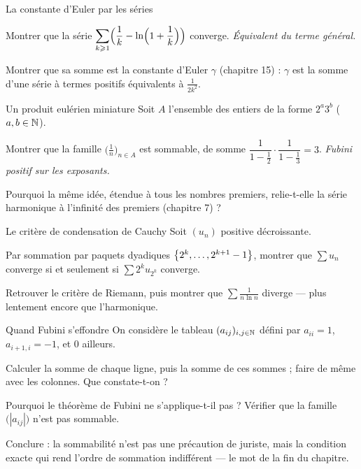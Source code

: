 \begin{exercice}[3]{La constante d'Euler par les séries}
\begin{questions}
  \item Montrer que la série
    $\displaystyle\sum_{k\geqslant1}\Bigl(\frac1k-\ln\Bigl(1+\frac1k\Bigr)\Bigr)$
    converge. \emph{Équivalent du terme général.}
  \item Montrer que sa somme est la constante d'Euler $\gamma$
    (chapitre 15) : $\gamma$ est la somme d'une série à termes positifs
    équivalents à $\frac{1}{2k^{2}}$.
\end{questions}
\end{exercice}

\begin{exercice}[3]{Un produit eulérien miniature}
Soit $A$ l'ensemble des entiers de la forme $2^{a}3^{b}$
($a,b\in\mathbb{N}$).
\begin{questions}
  \item Montrer que la famille $\bigl(\frac1n\bigr)_{n\in A}$ est
    sommable, de somme
    $\dfrac{1}{1-\frac12}\cdot\dfrac{1}{1-\frac13}=3$. \emph{Fubini
    positif sur les exposants.}
  \item Pourquoi la même idée, étendue à tous les nombres premiers,
    relie-t-elle la série harmonique à l'infinité des premiers
    (chapitre 7) ?
\end{questions}
\end{exercice}

\begin{exercice}[3]{Le critère de condensation de Cauchy}
Soit $(u_n)$ positive décroissante.
\begin{questions}
  \item Par sommation par paquets dyadiques
    $\left\{2^{k},\dots,2^{k+1}-1\right\}$, montrer que $\sum u_n$ converge si et
    seulement si $\sum2^{k}u_{2^{k}}$ converge.
  \item Retrouver le critère de Riemann, puis montrer que
    $\displaystyle\sum\frac{1}{n\ln n}$ diverge — plus lentement encore
    que l'harmonique.
\end{questions}
\end{exercice}

\begin{exercice}[3]{Quand Fubini s'effondre}
On considère le tableau $(a_{ij})_{i,j\in\mathbb{N}}$ défini par
$a_{ii}=1$, $a_{i+1,i}=-1$, et $0$ ailleurs.
\begin{questions}
  \item Calculer la somme de chaque ligne, puis la somme de ces sommes ;
    faire de même avec les colonnes. Que constate-t-on ?
  \item Pourquoi le théorème de Fubini ne s'applique-t-il pas ? Vérifier
    que la famille $\bigl(|a_{ij}|\bigr)$ n'est pas sommable.
  \item Conclure : la sommabilité n'est pas une précaution de juriste,
    mais la condition exacte qui rend l'ordre de sommation indifférent —
    le mot de la fin du chapitre.
\end{questions}
\end{exercice}



